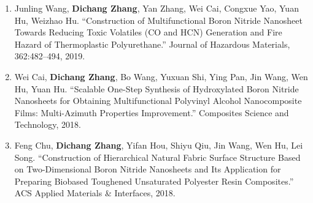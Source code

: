 \documentclass[11pt,letterpaper]{article}
\begin{document}
\begin{enumerate}
  \item Junling Wang, \textbf{Dichang Zhang}, Yan Zhang, Wei Cai, Congxue Yao, Yuan Hu, Weizhao Hu. ``Construction of Multifunctional Boron Nitride Nanosheet Towards Reducing Toxic Volatiles (CO and HCN) Generation and Fire Hazard of Thermoplastic Polyurethane.'' Journal of Hazardous Materials, 362:482--494, 2019.
  \item Wei Cai, \textbf{Dichang Zhang}, Bo Wang, Yuxuan Shi, Ying Pan, Jin Wang, Wen Hu, Yuan Hu. ``Scalable One-Step Synthesis of Hydroxylated Boron Nitride Nanosheets for Obtaining Multifunctional Polyvinyl Alcohol Nanocomposite Films: Multi-Azimuth Properties Improvement.'' Composites Science and Technology, 2018.
  \item Feng Chu, \textbf{Dichang Zhang}, Yifan Hou, Shiyu Qiu, Jin Wang, Wen Hu, Lei Song. ``Construction of Hierarchical Natural Fabric Surface Structure Based on Two-Dimensional Boron Nitride Nanosheets and Its Application for Preparing Biobased Toughened Unsaturated Polyester Resin Composites.'' ACS Applied Materials \& Interfaces, 2018.
\end{enumerate}
\end{document}
